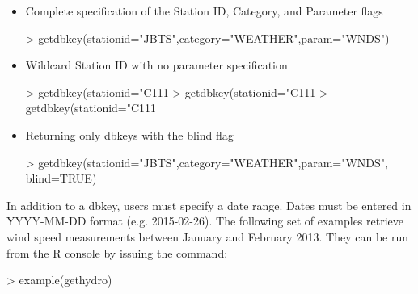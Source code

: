 \documentclass[12pt,notitlepage]{article}
\begin{document}
\begin{itemize}
\item Complete specification of the Station ID, Category, and Parameter flags

\begin{Schunk}
\begin{Sinput}
> getdbkey(stationid="JBTS",category="WEATHER",param="WNDS")
\end{Sinput}
\end{Schunk}

\item Wildcard Station ID with no parameter specification

\begin{Schunk}
\begin{Sinput}
> getdbkey(stationid="C111%
> getdbkey(stationid="C111%
> getdbkey(stationid="C111%
\end{Sinput}
\end{Schunk}

\item Returning only dbkeys with the blind flag

\begin{Schunk}
\begin{Sinput}
> getdbkey(stationid="JBTS",category="WEATHER",param="WNDS", blind=TRUE)
\end{Sinput}
\end{Schunk}

\end{itemize}


 In addition to a dbkey, users must specify a date range. Dates must be entered in YYYY-MM-DD format (e.g. 2015-02-26).   The following set of examples retrieve wind speed measurements between January and February 2013. They can be run from the R console by issuing the command:

\begin{Schunk}
\begin{Sinput}
> example(gethydro)
\end{Sinput}
\end{Schunk}
\end{document}
